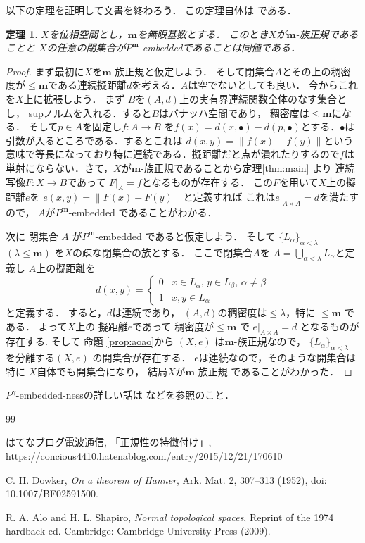\documentclass[leqno, a4paper, 12pt]{jsarticle}
\newtheorem{thm}{定理}
\begin{document}
以下の定理を証明して文書を終わろう．
この定理自体は
\cite[Theorem 15.6]{nor}である．
\begin{thm}
$X$を位相空間とし，$\mathbf{m}$を無限基数とする．
このとき$X$が$\mathbf{m}$-族正規であることと
$X$の任意の閉集合が$P^{\mathbf{m}}$-embeddedであることは同値である．
\end{thm}
\begin{proof}
まず最初に$X$を$\mathbf{m}$-族正規と仮定しよう．
そして閉集合$A$とその上の稠密度が$\le \mathbf{m}$である連続擬距離$d$を考える．$A$は空でないとしても良い．
今からこれを$X$上に拡張しよう．
まず
$B$を$(A, d)$上の実有界連続関数全体のなす集合とし，
supノルムを入れる．すると$B$はバナッハ空間であり，
稠密度は$\le \mathbf{m}$になる．
そして$p\in A$を固定し$f\colon A\to B$
を$f(x)=d(x, \bullet)-d(p, \bullet)$とする．$\bullet$は引数が入るところである．するとこれは
$d(x, y)=\|f(x)-f(y)\|$という意味で等長になっており特に連続である．擬距離だと点が潰れたりするので$f$は単射にならない．さて，$X$が$\mathbf{m}$-族正規であることから定理\ref{thm:main}
より
連続写像$F\colon X\to B$であって
$F|_{A}=f$となるものが存在する．
この$F$を用いて$X$上の擬距離$e$を
$e(x, y)=\|F(x)-F(y)\|$と定義すれば
これは$e|_{A\times A}=d$を満たすので，
$A$が$P^{\mathbf{m}}$-embedded
であることがわかる．

次に
閉集合
$A$
が$P^{\mathbf{m}}$-embedded
であると仮定しよう．
そして
$\{L_{\alpha}\}_{\alpha<\lambda}$$(\lambda\le \mathbf{m})$
を$X$の疎な閉集合の族とする．
ここで閉集合$A$を
$A=\bigcup_{\alpha<\lambda}L_{\alpha}$と定義し
$A$上の擬距離を
\[
d(x, y)=
\begin{cases}
0 & \text{$x\in L_{\alpha}$, $y\in L_{\beta}$, $\alpha\neq \beta$}\\
1  & \text{$x, y\in L_{\alpha}$}
\end{cases}
\]
と定義する．
すると，$d$は連続であり，
$(A, d)$の稠密度は$\le \lambda$，特に
$\le \mathbf{m}$
である．
よって$X$上の
擬距離$e$であって
稠密度が$\le \mathbf{m}$
で
$e|_{A\times A}=d$
となるものが存在する.
そして
命題
\ref{prop:aoao}から
$(X, e)$
は$\mathbf{m}$-族正規なので，
$\{L_{\alpha}\}_{\alpha<\lambda}$
を分離する$(X, e)$
の開集合が存在する．
$e$は連続なので，そのような開集合は特に
$X$自体でも開集合になり，
結局$X$が$\mathbf{m}$-族正規
であることがわかった．
\end{proof}


$P^{\gamma}$-embedded-nessの詳しい話は
\cite{nor}などを参照のこと．


\begin{thebibliography}{99}

はてなブログ電波通信, 
「正規性の特徴付け」, 
https://concious4410.hatenablog.com/entry/2015/12/21/170610

C. H. Dowker, 
\textit{On a theorem of Hanner}, 
Ark. Mat. 2, 307--313 (1952), 
doi:
10.1007/BF02591500. 


R. A. Alo and H. L. Shapiro, 
\textit{Normal topological spaces}, 
Reprint of the 1974 hardback ed. Cambridge: Cambridge University Press (2009). 
\end{thebibliography}
\end{document}
